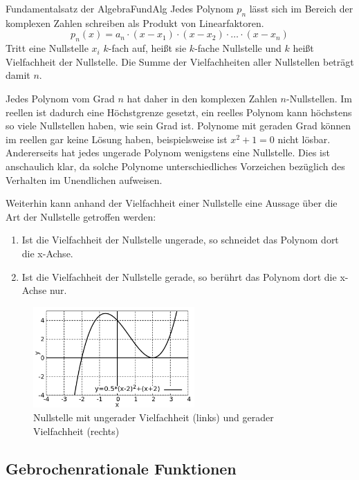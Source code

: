 \begin{statement}{Fundamentalsatz der Algebra}{FundAlg}
    Jedes Polynom $p_n$ lässt sich im Bereich der komplexen Zahlen schreiben als Produkt von Linearfaktoren.
    $$
        p_n(x) = a_n \cdot (x-x_1) \cdot (x-x_2) \cdot \dots \cdot (x-x_n)
    $$
    Tritt eine Nullstelle $x_i$ $k$-fach auf, heißt sie $k$-fache Nullstelle und $k$ heißt Vielfachheit der Nullstelle. Die Summe der Vielfachheiten aller Nullstellen beträgt damit $n$.
\end{statement}

Jedes Polynom vom Grad $n$ hat daher in den komplexen Zahlen $n$-Nullstellen. Im reellen ist dadurch eine Höchstgrenze gesetzt, ein reelles Polynom kann höchstens so viele Nullstellen haben, wie sein Grad ist.  Polynome mit geraden Grad können im reellen gar keine Lösung haben, beispielsweise ist $x^2+1=0$ nicht lösbar. Andererseits hat jedes ungerade Polynom wenigstens eine Nullstelle. Dies ist anschaulich klar, da solche Polynome unterschiedliches Vorzeichen bezüglich des Verhalten im Unendlichen aufweisen.

Weiterhin kann anhand der Vielfachheit einer Nullstelle eine Aussage über die Art der Nullstelle getroffen werden:

\begin{enumerate}
    \item Ist die Vielfachheit der Nullstelle ungerade, so schneidet das Polynom dort die x-Achse.
    \item Ist die Vielfachheit der Nullstelle gerade, so berührt das Polynom dort die x-Achse nur.
\end{enumerate}


\begin{figure}
    \centering
    \includegraphics[width=0.55\textwidth]{./gnuplot/polynom-root-multiplicity}
    \caption[Vielfachheit von Nullstellen]{Nullstelle mit ungerader Vielfachheit (links) und gerader Vielfachheit (rechts)}
    \label{fig:PolyRootMulti}
\end{figure}

\subsection{Gebrochenrationale Funktionen}

